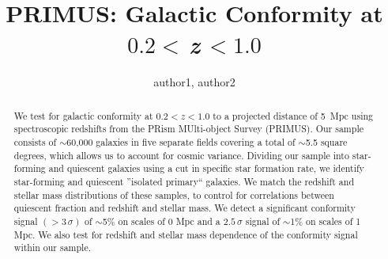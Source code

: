 \documentclass[apj,tighten,iop]{emulateapj2}
\begin{document}
\title{PRIMUS: Galactic Conformity at $0.2<\,$\MakeLowercase{\emph{z}}$\,<1.0$}

\author{
author1,
author2
}


\begin{abstract}
We test for galactic conformity at $0.2<z<1.0$ to a projected distance of 5~Mpc using spectroscopic redshifts from the PRism MUlti-object Survey (PRIMUS).
Our sample consists of $\sim$60,000 galaxies in five separate fields covering a total of $\sim$5.5 square degrees, which allows us to account for cosmic variance.
Dividing our sample into star-forming and quiescent galaxies using a cut in specific star formation rate, we identify star-forming and quiescent ''isolated primary`` galaxies.
We match the redshift and stellar mass distributions of these samples, to control for correlations between quiescent fraction and redshift and stellar mass.
We detect a significant conformity signal $(>3\,\sigma)$ of $\sim$5\% on scales of 0 Mpc and a $2.5\,\sigma$ signal of $\sim$1\% on scales of 1 Mpc.
We also test for redshift and stellar mass dependence of the conformity signal within our sample.
\end{abstract}






%



%

%


\end{document}
